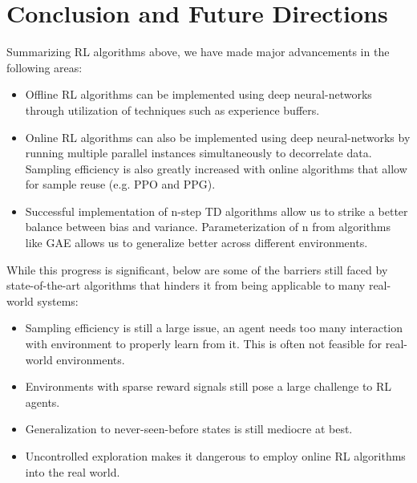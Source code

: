 \documentclass[11pt]{article} %
\begin{document}
\section{Conclusion and Future Directions}
Summarizing RL algorithms above, we have made major advancements in the following areas:
\begin{itemize}
    \item Offline RL algorithms can be implemented using deep neural-networks through utilization of techniques such as experience buffers.
    \item Online RL algorithms can also be implemented using deep neural-networks by running multiple parallel instances simultaneously to decorrelate data. Sampling efficiency is also greatly increased with online algorithms that allow for sample reuse (e.g. PPO and PPG).
    \item Successful implementation of n-step TD algorithms allow us to strike a better balance between bias and variance. Parameterization of n from algorithms like GAE allows us to generalize better across different environments.
\end{itemize}
While this progress is significant, below are some of the barriers still faced by state-of-the-art algorithms that hinders it from being applicable to many real-world systems:
\begin{itemize}
    \item Sampling efficiency is still a large issue, an agent needs too many interaction with environment to properly learn from it. This is often not feasible for real-world environments.
    \item Environments with sparse reward signals still pose a large challenge to RL agents. 
    \item Generalization to never-seen-before states is still mediocre at best. 
    \item Uncontrolled exploration makes it dangerous to employ online RL algorithms into the real world.
\end{itemize}

\newpage


\end{document}
